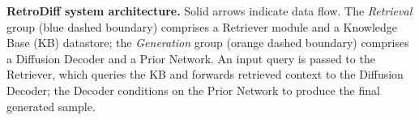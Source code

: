 \caption{\textbf{RetroDiff system architecture.} Solid arrows indicate data flow. The \textit{Retrieval} group (blue dashed boundary) comprises a Retriever module and a Knowledge Base (KB) datastore; the \textit{Generation} group (orange dashed boundary) comprises a Diffusion Decoder and a Prior Network. An input query is passed to the Retriever, which queries the KB and forwards retrieved context to the Diffusion Decoder; the Decoder conditions on the Prior Network to produce the final generated sample.}
